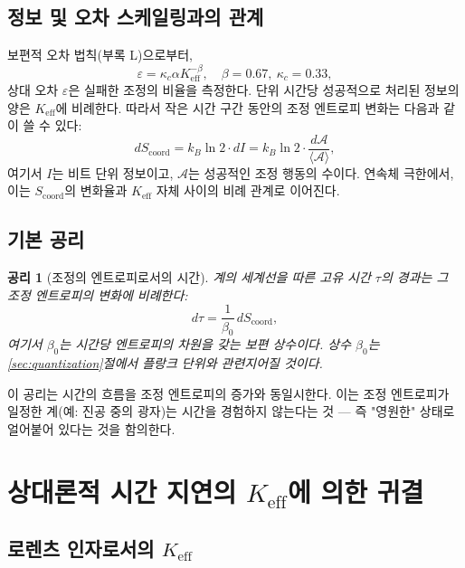 \documentclass[12pt,a4paper]{article}
\newtheorem{axiom}[theorem]{공리}
\newcommand{\Keff}{K_{\mathrm{eff}}}
\newcommand{\kappac}{\kappa_c}
\newcommand{\Scoord}{S_{\mathrm{coord}}}
\begin{document}
	\subsection{정보 및 오차 스케일링과의 관계}
	
	보편적 오차 법칙(부록 L)으로부터,
	\begin{equation}
		\varepsilon = \kappac \alpha \Keff^{-\beta}, \quad \beta = 0.67,\ \kappac = 0.33,
	\end{equation}
	상대 오차 \(\varepsilon\)은 실패한 조정의 비율을 측정한다. 단위 시간당 성공적으로 처리된 정보의 양은 \(\Keff\)에 비례한다. 따라서 작은 시간 구간 동안의 조정 엔트로피 변화는 다음과 같이 쓸 수 있다:
	\begin{equation}
		d\Scoord = k_B \ln 2 \cdot dI = k_B \ln 2 \cdot \frac{d\mathcal{A}}{\langle \mathcal{A} \rangle},
	\end{equation}
	여기서 \(I\)는 비트 단위 정보이고, \(\mathcal{A}\)는 성공적인 조정 행동의 수이다. 연속체 극한에서, 이는 \(\Scoord\)의 변화율과 \(\Keff\) 자체 사이의 비례 관계로 이어진다.
	
	\subsection{기본 공리}
	
	\begin{axiom}[조정의 엔트로피로서의 시간]
		계의 세계선을 따른 고유 시간 \(\tau\)의 경과는 그 조정 엔트로피의 변화에 비례한다:
		\begin{equation}
			d\tau = \frac{1}{\beta_0} \, d\Scoord,
			\label{eq:time_entropy}
		\end{equation}
		여기서 \(\beta_0\)는 시간당 엔트로피의 차원을 갖는 보편 상수이다. 상수 \(\beta_0\)는 \ref{sec:quantization}절에서 플랑크 단위와 관련지어질 것이다.
	\end{axiom}
	
	이 공리는 시간의 흐름을 조정 엔트로피의 증가와 동일시한다. 이는 조정 엔트로피가 일정한 계(예: 진공 중의 광자)는 시간을 경험하지 않는다는 것 — 즉 "영원한" 상태로 얼어붙어 있다는 것을 함의한다.
	
	\section{상대론적 시간 지연의 \(\Keff\)에 의한 귀결}
	\label{sec:sr}
	
	\subsection{로렌츠 인자로서의 \(\Keff\)}
	
\end{document}

